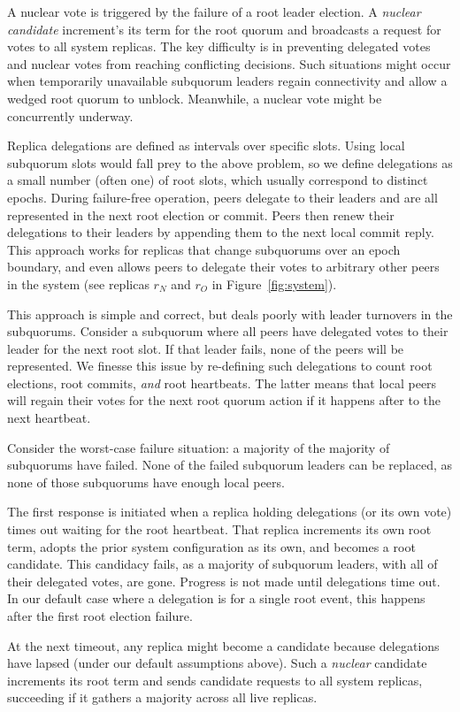 \documentclass[10pt,conference]{IEEEtran}
\newcommand{\sub}{subquorum\xspace}
\newcommand{\subs}{subquorums\xspace}
\newcommand{\roo}{root quorum\xspace}
\begin{document}
A nuclear vote is triggered by the failure of a root leader election.
A \emph{nuclear candidate}
increment's its term for the \roo and broadcasts a request for votes to all
system replicas.
The key difficulty is in preventing delegated votes and
nuclear votes from reaching conflicting decisions.
Such situations might occur when temporarily unavailable \sub leaders regain connectivity
and allow a wedged \roo to unblock.
Meanwhile, a nuclear vote might be concurrently underway.

Replica delegations are defined as intervals over specific slots.
Using local \sub slots would fall prey to the above problem, so we define
delegations as a small number (often one) of root slots, which usually
correspond to distinct epochs.
During failure-free operation, peers delegate to their leaders and are all
represented in the next root election or commit.
Peers then renew their delegations to their leaders by appending them to the
next local commit reply.
This approach works for replicas that change \subs over an epoch
boundary, and even allows peers to delegate their votes to arbitrary other
peers in the system (see replicas $r_N$ and $r_O$ in Figure~\ref{fig:system}).

This approach is simple and correct, but deals poorly with leader turnovers in
the \subs.
Consider a \sub where all peers have delegated votes to their leader
for the next root slot.
If that leader fails, none of the peers will be represented.
We finesse this issue by re-defining such delegations to count
root elections, root commits, \emph{and} root heartbeats.
The latter means that local peers will regain their votes for the next \roo
action if it happens after to the next heartbeat.

Consider the worst-case failure situation: a majority of the majority of \subs have
failed.
None of the failed \sub leaders can be replaced, as none of those \subs have
enough local peers.

The first response is initiated when a replica holding delegations (or its own
vote) times out waiting for the root heartbeat.
That replica increments its own root term, adopts the prior system
configuration as its own, and becomes a root candidate.
This candidacy fails, as a majority of \sub leaders, with all of their
delegated votes, are gone.
Progress is not made until delegations time out.
In our default case where a delegation is for a single root event, this
happens after the first root election failure.

At the next timeout, any replica might become a candidate because delegations have
lapsed (under our default assumptions above).
Such a \emph{nuclear} candidate increments its root term and
sends candidate requests to all system replicas,
succeeding if it gathers a majority across all live replicas.
\end{document}
